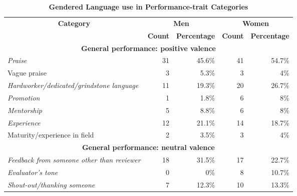 \documentclass[12pt]{caltech_thesis}
\begin{document}
 \begin{table}[htbp]
   \centering
   \caption{\textbf{Gendered Language use in Performance-trait Categories}}
   \begin{adjustbox}{max width=\textwidth - 2cm}
     \begin{tabular}{|l|r|r|r|r|}
     \hline
     \multicolumn{1}{|c|}{\textbf{Category}} & \multicolumn{2}{c|}{\textbf{Men}} & \multicolumn{2}{c|}{\textbf{Women}} \\
     \cline{2-5}          & \multicolumn{1}{c|}{\textbf{Count}} & \multicolumn{1}{c|}{\textbf{Percentage}} & \multicolumn{1}{c|}{\textbf{Count}} & \multicolumn{1}{c|}{\textbf{Percentage}} \\
     \hline
     \multicolumn{5}{|c|}{\textbf{General performance: positive valence}} \\
     \hline
     \hspace{0.5cm} \textit{Praise} & 31    & 45.6\% & 41    & 54.7\% \\
     \hspace{0.5cm} Vague praise & 3     & 5.3\% & 3     & 4\% \\
     \hspace{0.5cm} \textit{Hardworker/dedicated/grindstone language} & 11    & 19.3\% & 20    & 26.7\% \\
     \hspace{0.5cm} \textit{Promotion} & 1     & 1.8\% & 6     & 8\% \\
     \hspace{0.5cm} \textit{Mentorship} & 5     & 8.8\% & 6     & 8\% \\
     \hspace{0.5cm} \textit{Experience} & 12    & 21.1\% & 14    & 18.7\% \\
     \hspace{0.5cm} Maturity/experience in field & 2     & 3.5\% & 3     & 4\% \\
     \hline
     \multicolumn{5}{|c|}{\textbf{General performance: neutral valence}} \\
     \hline
     \hspace{0.5cm} \textit{Feedback from someone other than reviewer} & 18    & 31.5\% & 17    & 22.7\% \\
     \hspace{0.5cm} \textit{Evaluator’s tone} & 0     & 0\% & 8     & 10.7\% \\
     \hspace{0.5cm} \textit{Shout-out/thanking someone} & 7     & 12.3\% & 10    & 13.3\% \\

\end{tabular}
\end{adjustbox}
\end{table}
\end{document}
